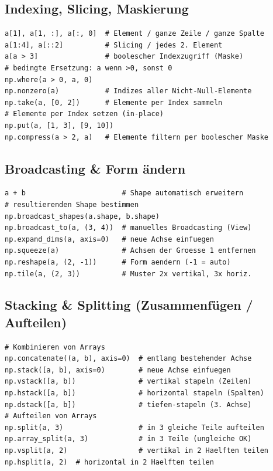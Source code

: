 \subsection{Indexing, Slicing, Maskierung}\label{sec:06-indexing-slicing-maskierung}
\begin{codebox}
\begin{lstlisting}[style=CodeExpert]
a[1], a[1, :], a[:, 0]  # Element / ganze Zeile / ganze Spalte
a[1:4], a[::2]          # Slicing / jedes 2. Element
a[a > 3]                # boolescher Indexzugriff (Maske)
# bedingte Ersetzung: a wenn >0, sonst 0
np.where(a > 0, a, 0)
np.nonzero(a)           # Indizes aller Nicht-Null-Elemente
np.take(a, [0, 2])      # Elemente per Index sammeln
# Elemente per Index setzen (in-place)
np.put(a, [1, 3], [9, 10])
np.compress(a > 2, a)   # Elemente filtern per boolescher Maske
\end{lstlisting}
\end{codebox}


\subsection{Broadcasting \& Form ändern}\label{sec:06-broadcasting-und-shapes}
\begin{codebox}
\begin{lstlisting}[style=CodeExpert]
a + b                       # Shape automatisch erweitern
# resultierenden Shape bestimmen
np.broadcast_shapes(a.shape, b.shape)
np.broadcast_to(a, (3, 4))  # manuelles Broadcasting (View)
np.expand_dims(a, axis=0)   # neue Achse einfuegen
np.squeeze(a)               # Achsen der Groesse 1 entfernen
np.reshape(a, (2, -1))      # Form aendern (-1 = auto)
np.tile(a, (2, 3))          # Muster 2x vertikal, 3x horiz.
\end{lstlisting}
\end{codebox}


\subsection{Stacking \& Splitting (Zusammenfügen / Aufteilen)}\label{sec:06-stacking-und-splitting}
\begin{codebox}
\begin{lstlisting}[style=CodeExpert]
# Kombinieren von Arrays
np.concatenate((a, b), axis=0)  # entlang bestehender Achse
np.stack([a, b], axis=0)        # neue Achse einfuegen
np.vstack([a, b])               # vertikal stapeln (Zeilen)
np.hstack([a, b])               # horizontal stapeln (Spalten)
np.dstack([a, b])               # tiefen-stapeln (3. Achse)
# Aufteilen von Arrays
np.split(a, 3)                  # in 3 gleiche Teile aufteilen
np.array_split(a, 3)            # in 3 Teile (ungleiche OK)
np.vsplit(a, 2)                 # vertikal in 2 Haelften teilen
np.hsplit(a, 2)  # horizontal in 2 Haelften teilen
\end{lstlisting}
\end{codebox}


